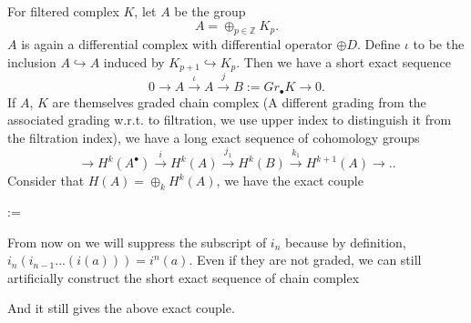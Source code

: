 \documentclass[11pt]{article}
\newcommand{\intg}{\mathbb Z}
\newcommand{\lrta}{\longrightarrow}
\newcommand{\inj}{\hookrightarrow}
\begin{document}
For filtered complex $K$, let $A$ be the group
$$
A=\oplus_{p\in\intg} K_p.
$$
$A$ is again a differential complex with differential operator $\oplus D$. Define $\iota$ to be the inclusion $A\inj A$ induced by $K_{p+1}\inj K_p$. Then we have a short exact sequence
$$
0\lrta A\overset{\iota}{\lrta} A\overset{j}{\lrta} B:=Gr_\bullet K\lrta 0.
$$
If $A$, $K$ are themselves graded chain complex (A different grading from the associated grading w.r.t. to filtration, we use upper index to distinguish it from the filtration index), we have a long exact sequence of cohomology groups
$$
\lrta H^k(A^{\bullet})\overset{i}{\lrta} H^{k}(A)\overset{j_1}{\lrta}H^{k}(B)\overset{k_1}{\lrta}H^{k+1}(A)\lrta..
$$
Consider that $H(A)=\oplus_{k}H^{k}(A)$, we have the exact couple
\begin{center}
:=
\end{center}
From now on we will suppress the subscript of $i_n$ because by definition, $i_n(i_{n-1}...(i(a)))=i^n(a)$. Even if they are not graded, we can still artificially construct the short exact sequence of chain complex
\begin{center}
\end{center}
And it still gives the above exact couple. 
\end{document}
